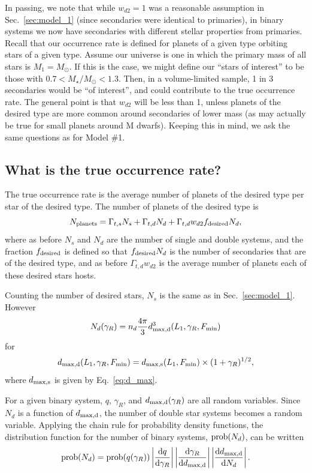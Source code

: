 \documentclass{emulateapj}
\begin{document}
In passing, we note that while $w_{d2}=1$ was a reasonable assumption in 
Sec.~\ref{sec:model_1} (since secondaries were identical to primaries), in 
binary systems we now have secondaries with different stellar properties from 
primaries.
Recall that our occurrence rate is defined for planets of a given type 
orbiting stars of a given type.
Assume our universe is one in which the primary mass of all stars is 
$M_1=M_\odot$.
If this is the case, we might define our ``stars of interest'' to be 
those with $0.7<M_\star/M_\odot<1.3$.
Then, in a volume-limited sample, 1 in 3 secondaries would be ``of interest'', 
and could contribute to the true occurrence rate.
The general point is that $w_{d2}$ will be less than 1, unless planets of the 
desired type are more common around secondaries of lower mass (as may actually 
be true for small planets around M dwarfs).
Keeping this in mind, we ask the same questions as for Model \#1.

\subsection{What is the true occurrence rate?}

The true occurrence rate is the average number of planets of the desired type 
per star of the desired type.
The number of planets of the desired type is
\begin{equation}
N_{\rm planets} = \Gamma_{t,s}N_s + \Gamma_{t,d}N_d + 
\Gamma_{t,d}w_{d2}f_{{\rm desired}}N_d,
\end{equation}
where as before $N_s$ and $N_d$ are the number of single and double systems, 
and the fraction $f_{{\rm desired}}$ is defined so that $f_{{\rm desired}} 
N_d$ is the number of secondaries that are of the desired type, and as before 
$\Gamma_{t,d}w_{d2}$ is the average number of planets each of these desired 
stars hosts.

Counting the number of desired stars, $N_s$ is the same as in 
Sec.~\ref{sec:model_1}. However
\begin{equation}
N_d(\gamma_R) = n_d \frac{4\pi}{3} d_{\rm max,d}^3(L_1, \gamma_R, F_{\rm 
	min})
\end{equation}
for
\begin{equation}
d_{\rm max,d}(L_1, \gamma_R, F_{\rm min}) =
d_{\rm max,s}(L_1, F_{\rm min})\times (1+\gamma_R)^{1/2},
\end{equation}
where $d_{\rm max,s}$ is given by Eq.~\ref{eq:d_max}.

For a given binary system, $q$, $\gamma_R$, and $d_{\rm 
	max,d}(\gamma_R)$ are all random variables.
Since $N_d$ is a function of $d_{\rm max,d}$, 
the number of double star systems becomes a random variable.
Applying the chain rule for probability density functions, the distribution 
function for the number of binary systems,
${\rm prob}(N_d)$, can be written 
\begin{equation}
{\rm prob}(N_d) = {\rm prob}(q(\gamma_R)) 
\left| \frac{{\rm d}q}{{\rm d}\gamma_R}  \right|
\left| \frac{{\rm d}\gamma_R}{{\rm d}d_{\rm max,d}}  \right|				
\left| \frac{{\rm d}d_{\rm max,d}}{{\rm d}N_d}  \right|.
\end{equation}
\end{document}
